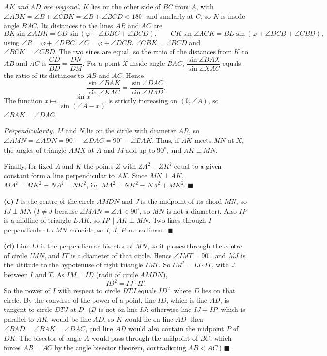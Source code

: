 \emph{$AK$ and $AD$ are isogonal.} $K$ lies on the other side of $BC$ from $A$, with $\angle ABK=\angle B+\angle CBK=\angle B+\angle BCD<180^\circ$ and similarly at $C$, so $K$ is inside angle $BAC$. Its distances to the lines $AB$ and $AC$ are
\[BK\sin\angle ABK=CD\sin\left(\varphi+\angle DBC+\angle BCD\right),\qquad CK\sin\angle ACK=BD\sin\left(\varphi+\angle DCB+\angle CBD\right),\]
using $\angle B=\varphi+\angle DBC$, $\angle C=\varphi+\angle DCB$, $\angle CBK=\angle BCD$ and $\angle BCK=\angle CBD$. The two sines are equal, so the ratio of the distances from $K$ to $AB$ and $AC$ is $\dfrac{CD}{BD}=\dfrac{DN}{DM}$. For a point $X$ inside angle $BAC$, $\dfrac{\sin\angle BAX}{\sin\angle XAC}$ equals the ratio of its distances to $AB$ and $AC$. Hence
\[\dfrac{\sin\angle BAK}{\sin\angle KAC}=\dfrac{\sin\angle DAC}{\sin\angle BAD}.\]
The function $x\mapsto\dfrac{\sin x}{\sin(\angle A-x)}$ is strictly increasing on $(0,\angle A)$, so $\angle BAK=\angle DAC$.

\emph{Perpendicularity.} $M$ and $N$ lie on the circle with diameter $AD$, so $\angle AMN=\angle ADN=90^\circ-\angle DAC=90^\circ-\angle BAK$. Thus, if $AK$ meets $MN$ at $X$, the angles of triangle $AMX$ at $A$ and $M$ add up to $90^\circ$, and $AK\perp MN$.

Finally, for fixed $A$ and $K$ the points $Z$ with $ZA^2-ZK^2$ equal to a given constant form a line perpendicular to $AK$. Since $MN\perp AK$, $MA^2-MK^2=NA^2-NK^2$, i.e. $MA^2+NK^2=NA^2+MK^2$. $\blacksquare$

\textbf{(c)} $I$ is the centre of the circle $AMDN$ and $J$ is the midpoint of its chord $MN$, so $IJ\perp MN$ ($I\ne J$ because $\angle MAN=\angle A<90^\circ$, so $MN$ is not a diameter). Also $IP$ is a midline of triangle $DAK$, so $IP\parallel AK\perp MN$. Two lines through $I$ perpendicular to $MN$ coincide, so $I$, $J$, $P$ are collinear. $\blacksquare$

\textbf{(d)} Line $IJ$ is the perpendicular bisector of $MN$, so it passes through the centre of circle $IMN$, and $IT$ is a diameter of that circle. Hence $\angle IMT=90^\circ$, and $MJ$ is the altitude to the hypotenuse of right triangle $IMT$. So $IM^2=IJ\cdot IT$, with $J$ between $I$ and $T$. As $IM=ID$ (radii of circle $AMDN$),
\[ID^2=IJ\cdot IT.\]
So the power of $I$ with respect to circle $DTJ$ equals $ID^2$, where $D$ lies on that circle. By the converse of the power of a point, line $ID$, which is line $AD$, is tangent to circle $DTJ$ at $D$. ($D$ is not on line $IJ$: otherwise line $IJ=IP$, which is parallel to $AK$, would be line $AD$, so $K$ would lie on line $AD$; then $\angle BAD=\angle BAK=\angle DAC$, and line $AD$ would also contain the midpoint $P$ of $DK$. The bisector of angle $A$ would pass through the midpoint of $BC$, which forces $AB=AC$ by the angle bisector theorem, contradicting $AB<AC$.) $\blacksquare$
